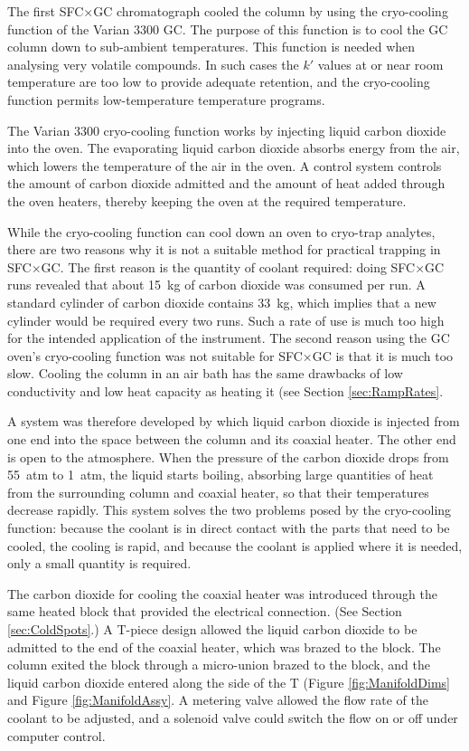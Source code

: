 The first SFC×GC chromatograph cooled the column by using the cryo-cooling
function of the Varian 3300 GC. The purpose of this function is to cool the GC
column down to sub-ambient temperatures. This function is needed when analysing
very volatile compounds. In such cases the \(k'\) values at or near room
temperature are too low to provide adequate retention, and the cryo-cooling
function permits low-temperature temperature programs.

The Varian 3300 cryo-cooling function works by injecting liquid carbon dioxide
into the oven. The evaporating liquid carbon dioxide absorbs energy from the
air, which lowers the temperature of the air in the oven. A control system
controls the amount of carbon dioxide admitted and the amount of heat added
through the oven heaters, thereby keeping the oven at the required temperature.

While the cryo-cooling function can cool down an oven to cryo-trap analytes,
there are two reasons why it is not a suitable method for practical trapping in
SFC×GC. The first reason is the quantity of coolant required: doing SFC×GC runs
revealed that about \SI{15}{\kilogram} of carbon dioxide was consumed per
run. A standard cylinder of carbon dioxide contains \SI{33}{\kilogram}, which
implies that a new cylinder would be required every two runs. Such a rate of use
is much too high for the intended application of the instrument. The second
reason using the GC oven's cryo-cooling function was not suitable for SFC×GC is
that it is much too slow. Cooling the column in an air bath has the same
drawbacks of low conductivity and low heat capacity as heating it (see Section
\ref{sec:RampRates}.

A system was therefore developed by which liquid carbon dioxide is injected from
one end into the space between the column and its coaxial heater. The other end
is open to the atmosphere. When the pressure of the carbon dioxide drops from
\SI{55}{atm} to \SI{1}{atm}, the liquid starts boiling, absorbing large
quantities of heat from the surrounding column and coaxial heater, so that their
temperatures decrease rapidly. This system solves the two problems posed by the
cryo-cooling function: because the coolant is in direct contact with the parts
that need to be cooled, the cooling is rapid, and because the coolant is applied
where it is needed, only a small quantity is required.

The carbon dioxide for cooling the coaxial heater was introduced through the
same heated block that provided the electrical connection. (See Section
\ref{sec:ColdSpots}.) A T-piece design allowed the liquid carbon dioxide to be
admitted to the end of the coaxial heater, which was brazed to the block. The
column exited the block through a micro-union brazed to the block, and the
liquid carbon dioxide entered along the side of the T (Figure
\ref{fig:ManifoldDims} and Figure \ref{fig:ManifoldAssy}.  A metering valve
allowed the flow rate of the coolant to be adjusted, and a solenoid valve could
switch the flow on or off under computer control.

